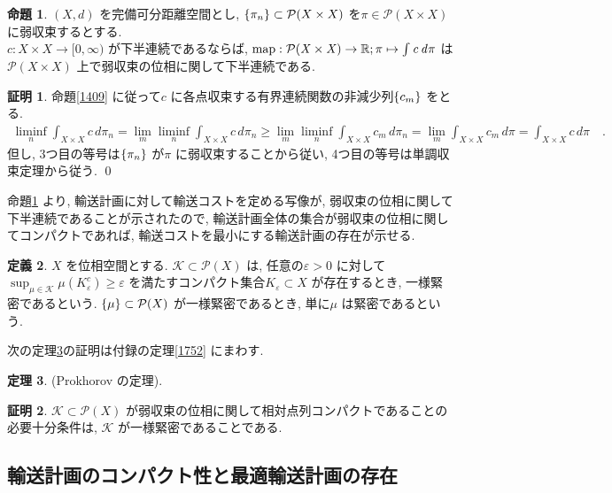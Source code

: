 \documentclass[10pt, fleqn, label-section=none, titlepage]{bxjsarticle}
\theoremstyle{definition}
\newtheorem{dfn}{定義}[section]
\newtheorem{prop}[dfn]{命題}
\newtheorem{thm}[dfn]{定理}
\newtheorem*{pf*}{証明}
\newcommand{\veps}{\varepsilon}
\newcommand{\cbra}[1]{\mleft\{#1\mright\}}
\renewcommand{\;}{\, ; \,}
\renewcommand{\d}{\, {d}}
\begin{document}
\begin{prop}
\label{1510}
$(X,d)$ を完備可分距離空間とし, $\cbra{\pi_n} \subset \mathcal{P}(X \times X)$ を$\pi \in \mathcal{P}(X\times X)$ に弱収束するとする. \\
$c:X\times X \rightarrow [0,\infty)$ が下半連続であるならば, 
$\rm{map}\it: \mathcal{P}(X\times X) \rightarrow \mathbb{R}; \pi \mapsto \int c \d\pi$ は
$\mathcal{P}(X\times X)$ 上で弱収束の位相に関して下半連続である.
\end{prop}
\begin{pf*}
命題\ref{1409} に従って$c$ に各点収束する有界連続関数の非減少列$\cbra{c_m}$ をとる. 
\begin{align*}
\liminf_n \int_{X\times X} c \d\pi_n  = \lim_m \liminf_n \int_{X\times X} c \d\pi_n \geq \lim_m \liminf_n \int_{X\times X} c_m \d \pi_n
= \lim_m \int_{X\times X} c_m  \d\pi = \int_{X\times X} c \d \pi \quad .
\end{align*}
但し, 3つ目の等号は$\cbra{\pi_n}$ が$\pi$ に弱収束することから従い, 4つ目の等号は単調収束定理から従う.
\qed
\end{pf*}

命題\ref{1510} より, 輸送計画に対して輸送コストを定める写像が, 弱収束の位相に関して下半連続であることが示されたので, 輸送計画全体の集合が弱収束の位相に関してコンパクトであれば, 輸送コストを最小にする輸送計画の存在が示せる. 

\begin{dfn}
$X$ を位相空間とする. $\mathcal{K} \subset \mathcal{P}(X)$ は, 任意の$\veps > 0$ に対して$\sup_{\mu \in \mathcal{K}}\mu(K_\veps ^c) \geq \veps$ を満たすコンパクト集合$K_\veps \subset X$ が存在するとき, 一様緊密であるという. $\cbra{\mu}\subset \mathcal{P}(X)$ が一様緊密であるとき, 単に$\mu$ は緊密であるという.

\end{dfn}

次の定理\ref{1816}の証明は付録の定理\ref{1752} にまわす.

\begin{thm}
\label{1816}
(Prokhorov の定理).
\end{thm}
\begin{pf*}
$\mathcal{K}\subset \mathcal{P}(X)$ が弱収束の位相に関して相対点列コンパクトであることの必要十分条件は, $\mathcal{K}$ が一様緊密であることである.
\end{pf*}

\subsection{輸送計画のコンパクト性と最適輸送計画の存在}
\end{document}
